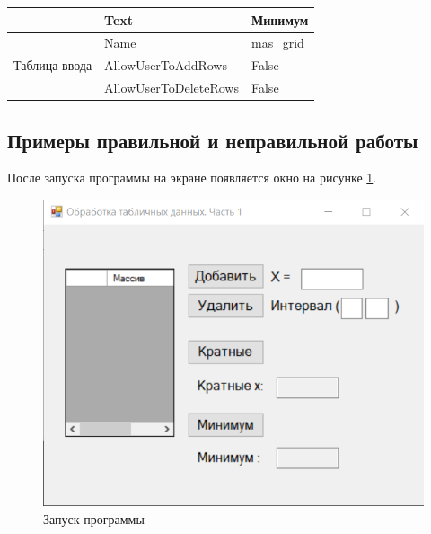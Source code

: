 \begin{table}[H]
\begin{tabular}{|l|l|l|}
                                                                            & Text                                                                           & Минимум                                                                       \\ \hline
\multirow{3}{*}{Таблица ввода}                                              & Name                                                                           & mas\_grid                                                                     \\ \cline{2-3} 
                                                                            & AllowUserToAddRows                                                             & False                                                                         \\ \cline{2-3} 
                                                                            & AllowUserToDeleteRows                                                          & False                                                                         \\ \hline
\end{tabular}
\label{task4_attributes}
\end{table}

\subsection{Примеры правильной и неправильной работы}
После запуска программы на экране появляется окно на рисунке \ref{task4_launch1}.
\begin{figure}[H]
    \centering
    \includegraphics[width=0.6\linewidth]{lections/img/task4_launch1.png}
    \caption{Запуск программы}
    \label{task4_launch1}
\end{figure}


